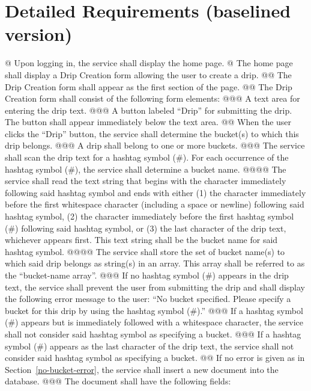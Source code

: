 \documentclass{article}
\begin{document}
\section*{Detailed Requirements (baselined version)}

\begin{easylist}[articletoc]
@ Upon logging in, the service shall display the home page.
@ The home page shall display a Drip Creation form allowing the user to create a drip.
@@ The Drip Creation form shall appear as the first section of the page.
@@ The Drip Creation form shall consist of the following form elements:
@@@ A text area for entering the drip text.
@@@ A button labeled ``Drip'' for submitting the drip. The button shall appear immediately below the text area.
@@ \label{submit-drip}When the user clicks the ``Drip'' button, the service shall determine the bucket(s) to which this drip belongs.
@@@ A drip shall belong to one or more buckets.
@@@ The service shall scan the drip text for a hashtag symbol (\#). For each occurrence of the hashtag symbol (\#), the service shall determine a bucket name.
@@@@ The service shall read the text string that begins with the character immediately following said hashtag symbol and ends with either (1) the character immediately before the first whitespace character (including a space or newline) following said hashtag symbol, (2) the character immediately before the first hashtag symbol (\#) following said hashtag symbol, or (3) the last character of the drip text, whichever appears first. This text string shall be the bucket name for said hashtag symbol.
@@@@ \label{bucket-name-array}The service shall store the set of bucket name(s) to which said drip belongs as string(s) in an array. This array shall be referred to as the ``bucket-name array''.
@@@ \label{no-bucket-error}If no hashtag symbol (\#) appears in the drip text, the service shall prevent the user from submitting the drip and shall display the following error message to the user: ``No bucket specified. Please specify a bucket for this drip by using the hashtag symbol (\#).''
@@@ If a hashtag symbol (\#) appears but is immediately followed with a whitespace character, the service shall not consider said hashtag symbol as specifying a bucket.
@@@ If a hashtag symbol (\#) appears as the last character of the drip text, the service shall not consider said hashtag symbol as specifying a bucket.
@@ If no error is given as in Section~\ref{no-bucket-error}, the service shall insert a new document into the database.
@@@ \label{field-list} The document shall have the following fields:

\end{easylist}
\end{document}
